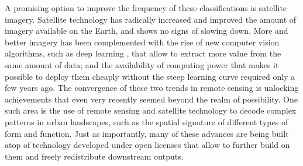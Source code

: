 A promising option to improve the frequency of these classifications is
satellite imagery.
Satellite technology has radically increased and improved the amount of
imagery available on the Earth, and shows no signs of slowing down.
More and better imagery has been complemented with the rise of new computer
vision algorithms, such as deep learning \citep{lecun2015},
that allow to extract more value from the same amount of data; and the
availability of computing power that makes it possible to deploy them cheaply
without the steep learning curve required only a few years ago.
The convergence of these two trends in remote sensing is unlocking
achievements that even very recently seemed beyond the realm of possibility.
One such area is the use of remote sensing and satellite technology to decode
complex patterns in urban landscapes, such as the spatial signature of
different types of form and function.
Just as importantly, many of these advances are being built atop of
technology developed under open licenses that allow to further build on them and freely
redistribute downstream outputs.

